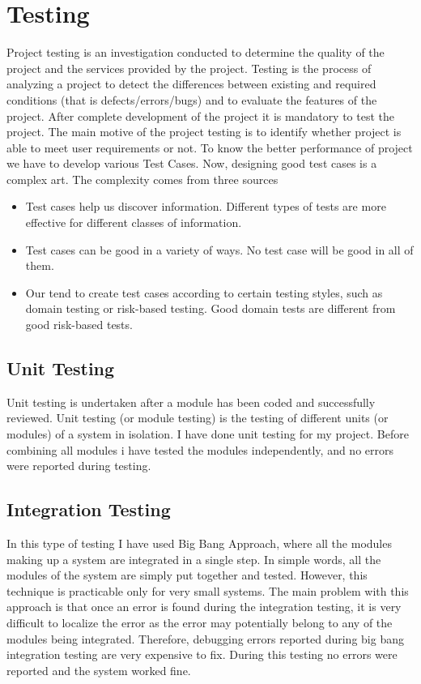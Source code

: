 \begin{enumerate}
\end{enumerate}

\section{Testing}
Project testing is an investigation conducted to determine the quality of the project and the services provided by the project. Testing is the process of analyzing a project to detect the differences between existing and required conditions (that is defects/errors/bugs) and to evaluate the features of the project. After complete development of the project it is mandatory to test the project. The main motive of the project testing is to identify whether project is able to meet user
requirements or not. To know the better performance of project we have to develop various Test Cases. Now, designing good test cases is a complex art. The complexity comes from three sources
\begin{itemize}
\item Test cases help us discover information. Different types of tests are more effective for different classes of information.
\item Test cases can be good in a variety of ways. No test case will be good in all of them.
\item Our tend to create test cases according to certain testing styles, such as domain testing or risk-based testing. Good domain tests are different from good risk-based tests.
\end{itemize}
\subsection{Unit Testing}
Unit testing is undertaken after a module has been coded and successfully reviewed. Unit testing (or module testing) is the testing of different units (or modules) of a system in isolation. I have done unit testing for my project. Before combining all modules i have tested the modules independently, and no errors were reported during testing.
\subsection{Integration Testing}
In this type of testing I have used Big Bang Approach, where all the modules
making up a system are integrated in a single step. In simple words, all the modules of the system are simply put together and tested. However, this technique is practicable only for very small systems. The main problem with this approach is that once an error is found during the integration testing, it is very difficult to localize the error as the error may potentially belong to any of the modules being integrated. Therefore, debugging errors reported during big bang integration testing are very expensive to fix. During this testing no errors were reported and the system worked fine.
